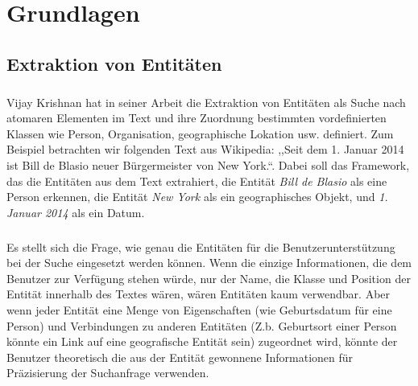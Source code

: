 \chapter{Grundlagen}

\section{Extraktion von Entitäten} \label{sec:Grundlagen}
\paragraph{}
Vijay Krishnan hat in seiner Arbeit\cite{Vijay/Vignesh:05} die Extraktion von Entitäten als Suche nach atomaren Elementen im Text und ihre Zuordnung bestimmten vordefinierten Klassen wie Person, Organisation, geographische Lokation usw. definiert. Zum Beispiel betrachten wir folgenden Text aus Wikipedia: ,,Seit dem 1. Januar 2014 ist Bill de Blasio neuer Bürgermeister von New York.``. Dabei soll das Framework, das die Entitäten aus dem Text extrahiert, die Entität \textit{Bill de Blasio} als eine Person erkennen, die Entität \textit{New York} als ein geographisches Objekt, und \textit{1. Januar 2014} als ein Datum.

\paragraph{}
Es stellt sich die Frage, wie genau die Entitäten für die Benutzerunterstützung bei der Suche eingesetzt werden können. Wenn die einzige Informationen, die dem Benutzer zur Verfügung stehen würde, nur der Name, die Klasse und Position der Entität innerhalb des Textes wären, wären Entitäten kaum verwendbar. Aber wenn jeder Entität eine Menge von Eigenschaften (wie Geburtsdatum für eine Person) und Verbindungen zu anderen Entitäten (Z.b. Geburtsort einer Person könnte ein Link auf eine geografische Entität sein) zugeordnet wird, könnte der Benutzer theoretisch die aus der Entität gewonnene Informationen für Präzisierung der Suchanfrage verwenden.

